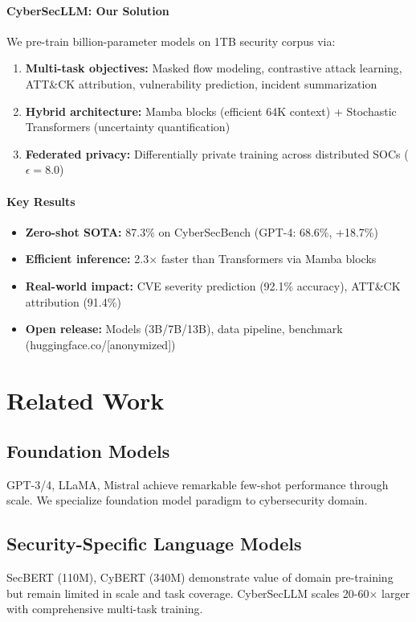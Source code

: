 \documentclass{article}
\begin{document}
\paragraph{CyberSecLLM: Our Solution}
We pre-train billion-parameter models on 1TB security corpus via:
\begin{enumerate}
\item \textbf{Multi-task objectives:} Masked flow modeling, contrastive attack learning, ATT\&CK attribution, vulnerability prediction, incident summarization
\item \textbf{Hybrid architecture:} Mamba blocks (efficient 64K context) + Stochastic Transformers (uncertainty quantification)
\item \textbf{Federated privacy:} Differentially private training across distributed SOCs ($\epsilon = 8.0$)
\end{enumerate}

\paragraph{Key Results}
\begin{itemize}
\item \textbf{Zero-shot SOTA:} 87.3\% on CyberSecBench (GPT-4: 68.6\%, +18.7\%)
\item \textbf{Efficient inference:} 2.3× faster than Transformers via Mamba blocks
\item \textbf{Real-world impact:} CVE severity prediction (92.1\% accuracy), ATT\&CK attribution (91.4\%)
\item \textbf{Open release:} Models (3B/7B/13B), data pipeline, benchmark (huggingface.co/[anonymized])
\end{itemize}

\section{Related Work}

\subsection{Foundation Models}
GPT-3/4, LLaMA, Mistral achieve remarkable few-shot performance through scale. We specialize foundation model paradigm to cybersecurity domain.

\subsection{Security-Specific Language Models}
SecBERT (110M), CyBERT (340M) demonstrate value of domain pre-training but remain limited in scale and task coverage. CyberSecLLM scales 20-60× larger with comprehensive multi-task training.
\end{document}
